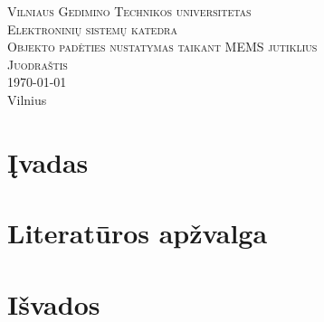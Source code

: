 \documentclass[11pt, a4paper]{article}
\begin{document}
  \begin{titlepage}
    \begin{center}
      \textsc{\LARGE Vilniaus Gedimino Technikos universitetas}\\[2mm]
      \textsc{\Large Elektroninių sistemų katedra}\\[70mm]
      \textsc{\Large Objekto padėties nustatymas taikant MEMS jutiklius}\\[60mm]
      \textsc{\Large Juodraštis}\\
      {\large \today  \ \currenttime}\\
      \vfill
      {\large Vilnius \\ \the\year}
    \end{center}
  \end{titlepage}

  \section{Įvadas}

  

  \section{Literatūros apžvalga}

  

  \section{Išvados}

  
  
\end{document}

